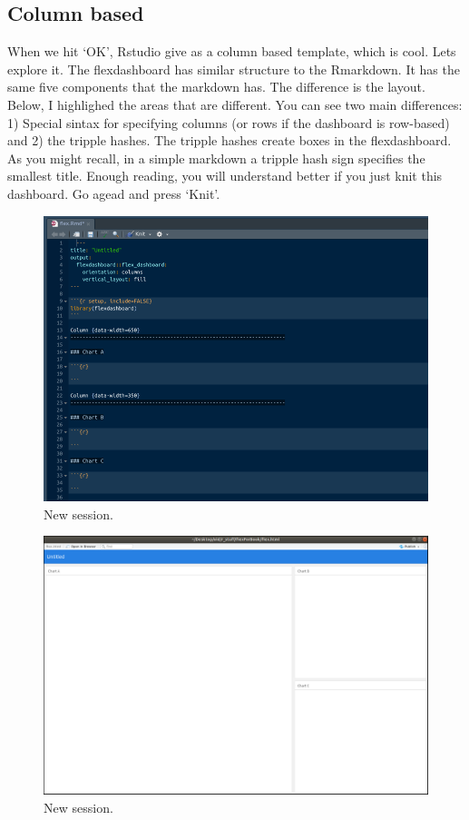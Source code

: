 \documentclass[]{book}
\begin{document}
\hypertarget{column-based}{%
\subsection{Column based}\label{column-based}}

When we hit `OK', Rstudio give as a column based template, which is cool. Lets explore it. The flexdashboard has similar structure to the Rmarkdown. It has the same five components that the markdown has. The difference is the layout. Below, I highlighed the areas that are different. You can see two main differences: 1) Special sintax for specifying columns (or rows if the dashboard is row-based) and 2) the tripple hashes. The tripple hashes create boxes in the flexdashboard. As you might recall, in a simple markdown a tripple hash sign specifies the smallest title. Enough reading, you will understand better if you just knit this dashboard. Go agead and press `Knit'.

\begin{figure}
\centering
\includegraphics{flex2.png}
\caption{New session.}
\end{figure}

\begin{figure}
\centering
\includegraphics{flex3.png}
\caption{New session.}
\end{figure}
\end{document}

